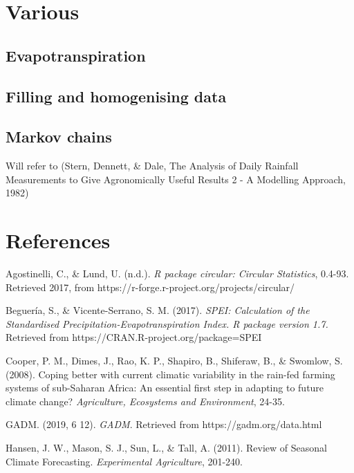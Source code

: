\documentclass[
  letterpaper,
  DIV=11,
  numbers=noendperiod]{scrreprt}
\begin{document}
\chapter{Various}\label{various}

\section{Evapotranspiration}\label{evapotranspiration}

\section{Filling and homogenising
data}\label{filling-and-homogenising-data}

\section{Markov chains}\label{markov-chains}

Will refer to (Stern, Dennett, \& Dale, The Analysis of Daily Rainfall
Measurements to Give Agronomically Useful Results 2 - A Modelling
Approach, 1982)


\chapter{References}\label{references}

Agostinelli, C., \& Lund, U. (n.d.). \emph{R package
\textquotesingle circular\textquotesingle: Circular Statistics}, 0.4-93.
Retrieved 2017, from https://r-forge.r-project.org/projects/circular/

Beguería, S., \& Vicente-Serrano, S. M. (2017). \emph{SPEI: Calculation
of the Standardised Precipitation-Evapotranspiration Index. R package
version 1.7.} Retrieved from https://CRAN.R-project.org/package=SPEI

Cooper, P. M., Dimes, J., Rao, K. P., Shapiro, B., Shiferaw, B., \&
Swomlow, S. (2008). Coping better with current climatic variability in
the rain-fed farming systems of sub-Saharan Africa: An essential first
step in adapting to future climate change? \emph{Agriculture, Ecosystems
and Environment}, 24-35.

GADM. (2019, 6 12). \emph{GADM}. Retrieved from
https://gadm.org/data.html

Hansen, J. W., Mason, S. J., Sun, L., \& Tall, A. (2011). Review of
Seasonal Climate Forecasting. \emph{Experimental Agriculture}, 201-240.
\end{document}
